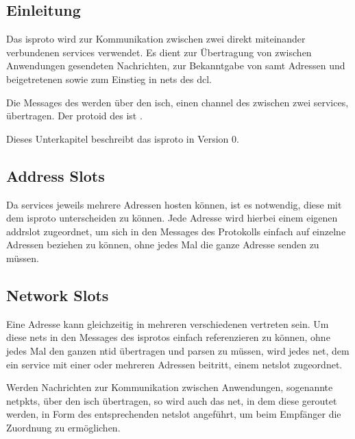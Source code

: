 
\subsection{Einleitung}
Das \gls{isproto} wird zur Kommunikation zwischen zwei direkt miteinander verbundenen \glspl{service}
verwendet.
Es dient zur Übertragung von zwischen Anwendungen gesendeten Nachrichten, zur
Bekanntgabe von  samt Adressen und beigetretenen
 sowie zum Einstieg in \glspl{net} des \gls{dcl}.

Die Messages des  werden über den
\gls{isch}, einen \gls{channel} des  zwischen zwei
\glspl{service}, übertragen. Der \gls{protoid} des
 ist .

Dieses Unterkapitel beschreibt das \gls{isproto} in Version 0.

\subsection{Address Slots}
Da \glspl{service} jeweils mehrere Adressen hosten können, ist es notwendig, diese mit dem
\gls{isproto} unterscheiden zu können. Jede Adresse wird hierbei einem eigenen \gls{addrslot}
zugeordnet, um sich in den Messages des Protokolls einfach auf einzelne Adressen beziehen zu können,
ohne jedes Mal die ganze Adresse senden zu müssen.

\subsection{Network Slots}
Eine Adresse kann gleichzeitig in mehreren verschiedenen  vertreten sein. Um diese
\glspl{net} in den Messages des \gls{isproto}s einfach referenzieren zu können, ohne jedes Mal den
ganzen \gls{ntid} übertragen und parsen zu müssen, wird jedes \gls{net}, dem ein \gls{service} mit einer
oder mehreren Adressen beitritt, einem \gls{netslot} zugeordnet.

Werden Nachrichten zur Kommunikation zwischen Anwendungen, sogenannte
\glspl{netpkt}, über den \gls{isch} übertragen, so wird auch das \gls{net}, in
dem diese geroutet werden, in Form des entsprechenden \gls{netslot} angeführt,
um beim Empfänger die Zuordnung zu ermöglichen.

